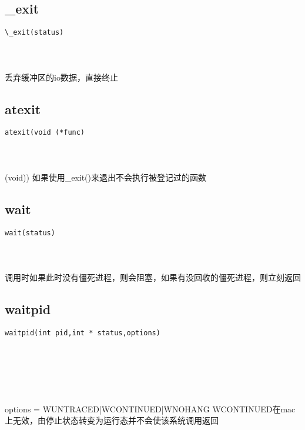 \documentclass[10pt,a4paper]{article}
\begin{document}
\subsection{\_exit}
\begin{spacing}{2.0}
\lstset{language=C,numbers=none}
\begin{lstlisting}
\_exit(status)
\end{lstlisting}
{\large\color[rgb]{0.2,0.4,0.6}{status:}}
\paragraph{ \ \ }丢弃缓冲区的io数据，直接终止
\end{spacing}

\subsection{atexit}
\begin{spacing}{2.0}
\lstset{language=C,numbers=none}
\begin{lstlisting}
atexit(void (*func)
\end{lstlisting}
{\large\color[rgb]{0.2,0.4,0.6}{(*func:}}
\paragraph{ \ \ }(void)) 如果使用\_exit()来退出不会执行被登记过的函数
\end{spacing}

\subsection{wait}
\begin{spacing}{2.0}
\lstset{language=C,numbers=none}
\begin{lstlisting}
wait(status)
\end{lstlisting}
{\large\color[rgb]{0.2,0.4,0.6}{status:}}
\paragraph{ \ \ }调用时如果此时没有僵死进程，则会阻塞，如果有没回收的僵死进程，则立刻返回
\end{spacing}

\subsection{waitpid}
\begin{spacing}{2.0}
\lstset{language=C,numbers=none}
\begin{lstlisting}
waitpid(int pid,int * status,options)
\end{lstlisting}
{\large\color[rgb]{0.2,0.4,0.6}{pid:}} \\
{\large\color[rgb]{0.2,0.4,0.6}{status:}} \\
{\large\color[rgb]{0.2,0.4,0.6}{options:}}
\paragraph{ \ \ }options = WUNTRACED|WCONTINUED|WNOHANG WCONTINUED在mac上无效，由停止状态转变为运行态并不会使该系统调用返回
\end{spacing}
\end{document}
